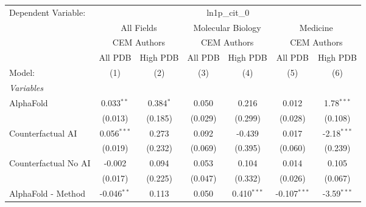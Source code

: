 \begingroup
\centering
\begin{tabular}{lcccccc}
   \tabularnewline \midrule \midrule
   Dependent Variable: & \multicolumn{6}{c}{ln1p\_cit\_0}\\
 & \multicolumn{2}{c}{All Fields} & \multicolumn{2}{c}{Molecular Biology} & \multicolumn{2}{c}{Medicine} \\
\cmidrule(lr){2-3} \cmidrule(lr){4-5} \cmidrule(lr){6-7}
 & \multicolumn{2}{c}{CEM Authors} & \multicolumn{2}{c}{CEM Authors} & \multicolumn{2}{c}{CEM Authors} \\
\cmidrule(lr){2-3} \cmidrule(lr){4-5} \cmidrule(lr){6-7}
 & \multicolumn{1}{c}{All PDB} & \multicolumn{1}{c}{High PDB} & \multicolumn{1}{c}{All PDB} & \multicolumn{1}{c}{High PDB} & \multicolumn{1}{c}{All PDB} & \multicolumn{1}{c}{High PDB} \\
\cmidrule(lr){2-2} \cmidrule(lr){3-3} \cmidrule(lr){4-4} \cmidrule(lr){5-5} \cmidrule(lr){6-6} \cmidrule(lr){7-7}
   Model:                                                     & (1)           & (2)            & (3)     & (4)           & (5)            & (6)\\  
   \midrule
   \emph{Variables}\\
   AlphaFold                                                  & 0.033$^{**}$  & 0.384$^{*}$    & 0.050   & 0.216         & 0.012          & 1.78$^{***}$\\   
                                                              & (0.013)       & (0.185)        & (0.029) & (0.299)       & (0.028)        & (0.108)\\   
   Counterfactual AI                                          & 0.056$^{***}$ & 0.273          & 0.092   & -0.439        & 0.017          & -2.18$^{***}$\\   
                                                              & (0.019)       & (0.232)        & (0.069) & (0.395)       & (0.060)        & (0.239)\\   
   Counterfactual No AI                                       & -0.002        & 0.094          & 0.053   & 0.104         & 0.014          & 0.105\\   
                                                              & (0.017)       & (0.225)        & (0.047) & (0.332)       & (0.026)        & (0.067)\\   
   AlphaFold - Method                                         & -0.046$^{**}$ & 0.113          & 0.050   & 0.410$^{***}$ & -0.107$^{***}$ & -3.59$^{***}$\\   

\end{tabular}

